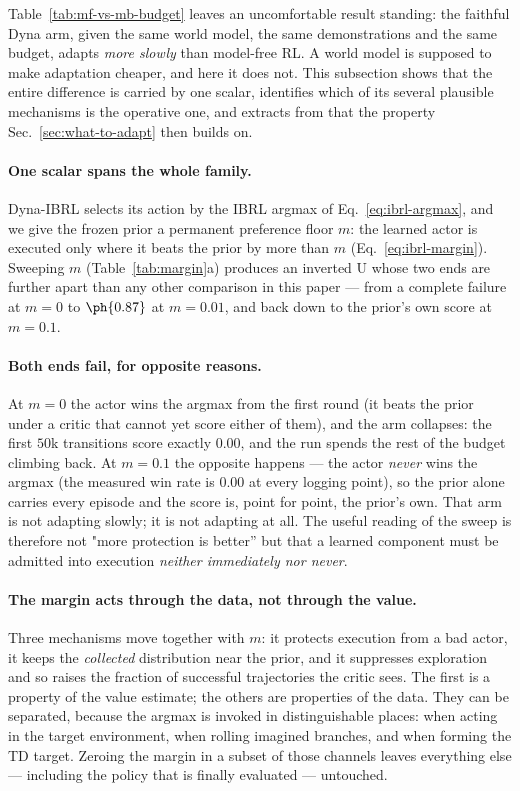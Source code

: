 Table~\ref{tab:mf-vs-mb-budget} leaves an uncomfortable result standing: the
faithful Dyna arm, given the same world model, the same demonstrations and the
same budget, adapts \emph{more slowly} than model-free RL. A world model is
supposed to make adaptation cheaper, and here it does not. This subsection
shows that the entire difference is carried by one scalar, identifies which of
its several plausible mechanisms is the operative one, and extracts from that
the property Sec.~\ref{sec:what-to-adapt} then builds on.

\paragraph{One scalar spans the whole family.}
Dyna-IBRL selects its action by the IBRL argmax of Eq.~\ref{eq:ibrl-argmax},
and we give the frozen prior a permanent preference floor $m$: the learned
actor is executed only where it beats the prior by more than $m$
(Eq.~\ref{eq:ibrl-margin}). Sweeping $m$ (Table~\ref{tab:margin}a) produces an
inverted U whose two ends are further apart than any other comparison in this
paper --- from a complete failure at $m=0$ to $\ph{0.87}$ at $m=0.01$, and back
down to the prior's own score at $m=0.1$.

\paragraph{Both ends fail, for opposite reasons.}
At $m=0$ the actor wins the argmax from the first round (it beats the prior
under a critic that cannot yet score either of them), and the arm collapses:
the first $50$k transitions score exactly $0.00$, and the run spends the rest of
the budget climbing back. At $m=0.1$ the opposite happens --- the actor
\emph{never} wins the argmax (the measured win rate is $0.00$ at every logging
point), so the prior alone carries every episode and the score is, point for
point, the prior's own. That arm is not adapting slowly; it is not adapting at
all. The useful reading of the sweep is therefore not "more protection is
better'' but that a learned component must be admitted into execution
\emph{neither immediately nor never}.

\paragraph{The margin acts through the data, not through the value.}
Three mechanisms move together with $m$: it protects execution from a bad
actor, it keeps the \emph{collected} distribution near the prior, and it
suppresses exploration and so raises the fraction of successful trajectories the
critic sees. The first is a property of the value estimate; the others are
properties of the data. They can be separated, because the argmax is invoked in
distinguishable places: when acting in the target environment, when rolling
imagined branches, and when forming the TD target. Zeroing the margin in a
subset of those channels leaves everything else --- including the policy that is
finally evaluated --- untouched.

